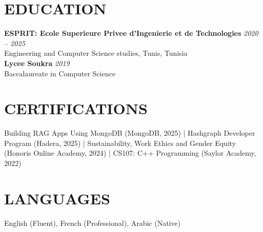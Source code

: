 \documentclass[10pt,a4paper]{article}
\begin{document}
\section*{EDUCATION}
\textbf{ESPRIT: Ecole Superieure Privee d'Ingenierie et de Technologies} \hfill \textit{2020 -- 2025}\\
Engineering and Computer Science studies, Tunis, Tunisia\\
\textbf{Lycee Soukra} \hfill \textit{2019}\\
Baccalaureate in Computer Science

\section*{CERTIFICATIONS}
Building RAG Apps Using MongoDB (MongoDB, 2025) \;|\; Hashgraph Developer Program (Hadera, 2025) \;|\; Sustainability, Work Ethics and Gender Equity (Honoris Online Academy, 2024) \;|\; CS107: C++ Programming (Saylor Academy, 2022)

\section*{LANGUAGES}
English (Fluent), French (Professional), Arabic (Native)
\end{document}
